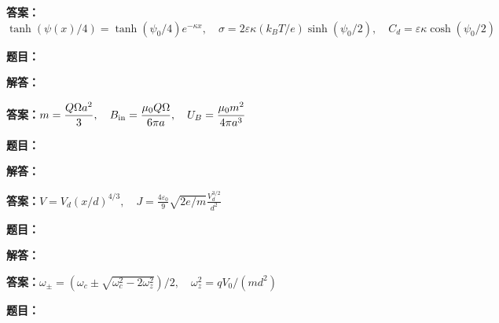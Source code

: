 \documentclass[lang=cn,color=blue,11pt]{elegantbook}
\begin{document}
\par\noindent\textbf{答案：}\(\displaystyle \tanh(\psi(x)/4)=\tanh(\psi_0/4)e^{-\kappa x},\quad\sigma=2\varepsilon\kappa(k_BT/e)\sinh(\psi_0/2),\quad C_d=\varepsilon\kappa\cosh(\psi_0/2)\)\par
\par\smallskip\noindent\hrulefill\par\medskip
{}\par
\noindent\textbf{题目：}
\par\noindent\textbf{解答：}
\par\noindent\textbf{答案：}\(\displaystyle m=\frac{Q\Omega a^2}{3},\quad B_{\rm in}=\frac{\mu_0 Q\Omega}{6\pi a},\quad U_B=\frac{\mu_0m^2}{4\pi a^3}\)\par
\par\smallskip\noindent\hrulefill\par\medskip
{}\par
\noindent\textbf{题目：}
\par\noindent\textbf{解答：}
\par\noindent\textbf{答案：}\(\displaystyle V=V_d(x/d)^{4/3},\quad J=\frac{4\varepsilon_0}{9}\sqrt{2e/m}\frac{V_d^{3/2}}{d^2}\)\par
\par\smallskip\noindent\hrulefill\par\medskip
{}\par
\noindent\textbf{题目：}
\par\noindent\textbf{解答：}
\par\noindent\textbf{答案：}\(\displaystyle \omega_\pm=(\omega_c\pm\sqrt{\omega_c^2-2\omega_z^2})/2,\quad \omega_z^2=qV_0/(md^2)\)\par
\par\smallskip\noindent\hrulefill\par\medskip
{}\par
\noindent\textbf{题目：}
\end{document}
